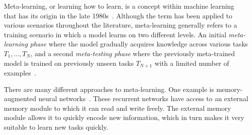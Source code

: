 Meta-learning, or learning how to learn, is a concept within machine learning that has its origin in the late 1980s~\cite{unsup-maml-rand}. Although the term has been applied to various scenarios throughout the literature, meta-learning generally refers to a training scenario in which a model learns on two different levels. An initial \textit{meta-learning phase} where the model gradually acquires knowledge across various tasks $T_1, ..., T_N$, and a second \textit{meta-testing phase} where the previously meta-trained model is trained on previously unseen tasks $T_{N+1}$ with a limited number of examples~\cite{maml, unsup-maml-rand, santoro}. 


There are many different approaches to meta-learning. One example is memory-augmented neural networks~\cite{santoro}. These recurrent networks have access to an external memory module to which it can read and write freely. The external memory module allows it to quickly encode new information, which in turn makes it very suitable to learn new tasks quickly. 

